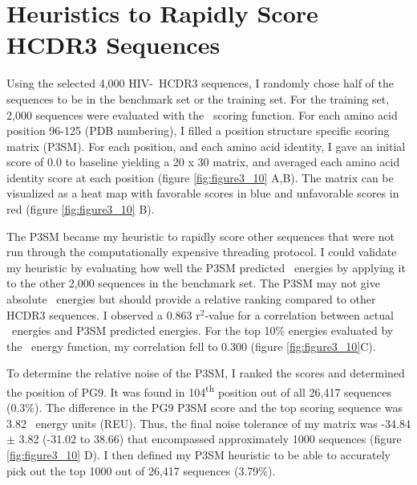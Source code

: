 \section{Heuristics to Rapidly Score HCDR3 Sequences}
Using the selected 4,000 HIV-\naive~HCDR3 sequences, I randomly chose half of the sequences to be in the benchmark set or the training set. For the training set, 2,000 sequences were evaluated with the \rosetta~scoring function. For each amino acid position 96-125 (PDB numbering), I filled a position structure specific scoring matrix (P3SM). For each position, and each amino acid identity, I gave an initial score of 0.0 to baseline yielding a 20 x 30 matrix, and averaged each amino acid identity score at each position (figure \ref{fig:figure3_10} A,B). The matrix can be visualized as a heat map with favorable scores in blue and unfavorable scores in red (figure \ref{fig:figure3_10} B).

The P3SM became my heuristic to rapidly score other sequences that were not run through the computationally expensive threading protocol. I could validate my heuristic by evaluating how well the P3SM predicted \rosetta~energies by applying it to the other 2,000 sequences in the benchmark set. The P3SM may not give absolute \rosetta~energies but should provide a relative ranking compared to other HCDR3 sequences. I observed a 0.863 r$^{2}$-value for a correlation between actual \rosetta~energies and P3SM predicted energies. For the top 10\% energies evaluated by the \rosetta~energy function, my correlation fell to 0.300 (figure \ref{fig:figure3_10}C).

To determine the relative noise of the P3SM, I ranked the scores and determined the position of PG9. It was found in 104\textsuperscript{th} position out of all 26,417 sequences (0.3\%). The difference in the PG9 P3SM score and the top scoring sequence was 3.82 \rosetta~energy units (REU). Thus, the final noise tolerance of my matrix was -34.84 $\pm$ 3.82 (-31.02 to 38.66) that encompassed approximately 1000 sequences (figure \ref{fig:figure3_10} D). I then defined my P3SM heuristic to be able to accurately pick out the top 1000 out of 26,417 sequences (3.79\%).

